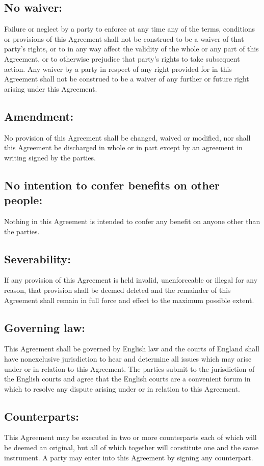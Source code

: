 \documentclass[a4paper,12pt]{article}
\begin{document}
\subsection{No waiver:}  Failure or neglect by a party to enforce at any time any of the terms, conditions or provisions of this Agreement shall not be construed to be a waiver of that party’s rights, or to in any way affect the validity of the whole or any part of this Agreement, or to otherwise prejudice that party’s rights to take subsequent action.  Any waiver by a party in respect of any right provided for in this Agreement shall not be construed to be a waiver of any further or future right arising under this Agreement.
\subsection{Amendment:}  No provision of this Agreement shall be changed, waived or modified, nor shall this Agreement be discharged in whole or in part except by an agreement in writing signed by the parties.
\subsection{No intention to confer benefits on other people:}  Nothing in this Agreement is intended to confer any benefit on anyone other than the parties.
\subsection{Severability: } If any provision of this Agreement is held invalid, unenforceable or illegal for any reason, that provision shall be deemed deleted and the remainder of this Agreement shall remain in full force and effect to the maximum possible extent.
\subsection{Governing law: }  This Agreement shall be governed by English law and the courts of England shall have nonexclusive jurisdiction to hear and determine all issues which may arise under or in relation to this Agreement.  The parties submit to the jurisdiction of the English courts and agree that the English courts are a convenient forum in which to resolve any dispute arising under or in relation to this Agreement. 
\subsection{Counterparts:}  This Agreement may be executed in two or more counterparts each of which will be deemed an original, but all of which together will constitute one and the same instrument.  A party may enter into this Agreement by signing any counterpart.
\end{document}
